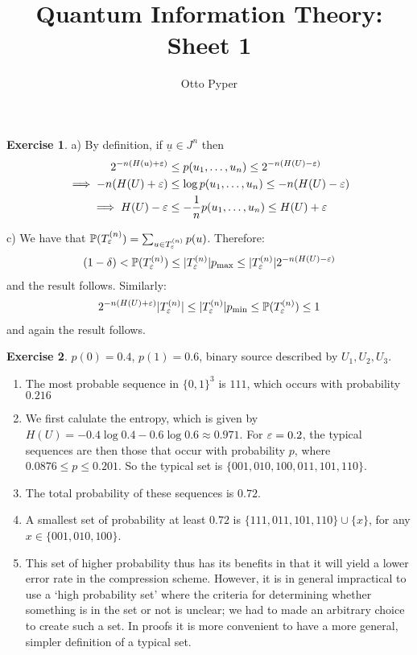 \documentclass[]{article}
\title{Quantum Information Theory: Sheet 1}
\author{Otto Pyper}
\date{}
\newcommand{\ten}{T_\eps^{(n)}}
\begin{document}
\maketitle


\textbf{Exercise 1}. a) By definition, if $\underline{u}\in J^n$ then
\begin{align*}
    2^{-n(H(u)+\varepsilon)}&\le p(u_1,\dots,u_n) \le 2^{-n(H(U)-\varepsilon)}\\
    \implies -n(H(U)+\varepsilon) &\le \log p(u_1,\dots,u_n) \le -n(H(U)-\varepsilon)\\
    \implies H(U)-\varepsilon &\le -\frac{1}{n}p(u_1,\dots,u_n) \le H(U) + \varepsilon
\end{align*}

c) We have that $\mathbb{P}(T_\varepsilon^{(n)})  = \sum_{u \in T_\varepsilon^{(n)}}p(u)$. Therefore:
\begin{align*}
    (1-\delta) < \P(T_\eps^{(n)}) \le |\ten|p_{\max} \le |\ten|2^{-n(H(U)-\eps)}
\end{align*}
and the result follows. Similarly:
\begin{align*}
    2^{-n(H(U)+\eps)}|\ten| \le |\ten| p_{\min} \le \P(\ten) \le 1
\end{align*}
and again the result follows.

\textbf{Exercise 2}. $p(0) = 0.4$, $p(1) = 0.6$, binary source described by $U_1,U_2,U_3$.

\begin{enumerate}
    \item The most probable sequence in $\{0,1\}^3$ is $111$, which occurs with probability $0.216$
    \item We first calulate the entropy, which is given by $H(U) = -0.4\log0.4 - 0.6\log 0.6 \approx 0.971$. For $\varepsilon = 0.2$, the typical sequences are then those that occur with probability $p$, where $0.0876 \le p \le 0.201$. So the typical set is $\{001,010,100,011,101,110\}$.
    \item The total probability of these sequences is $0.72$.
    \item A smallest set of probability at least $0.72$ is $\{111,011,101,110\} \cup\{x\}$, for any $x \in \{001,010,100\}$.
    
    \item This set of higher probability thus has its benefits in that it will yield a lower error rate in the compression scheme. However, it is in general impractical to use a `high probability set' where the criteria for determining whether something is in the set or not is unclear; we had to made an arbitrary choice to create such a set. In proofs it is more convenient to have a more general, simpler definition of a typical set.
\end{enumerate}
\end{document}

